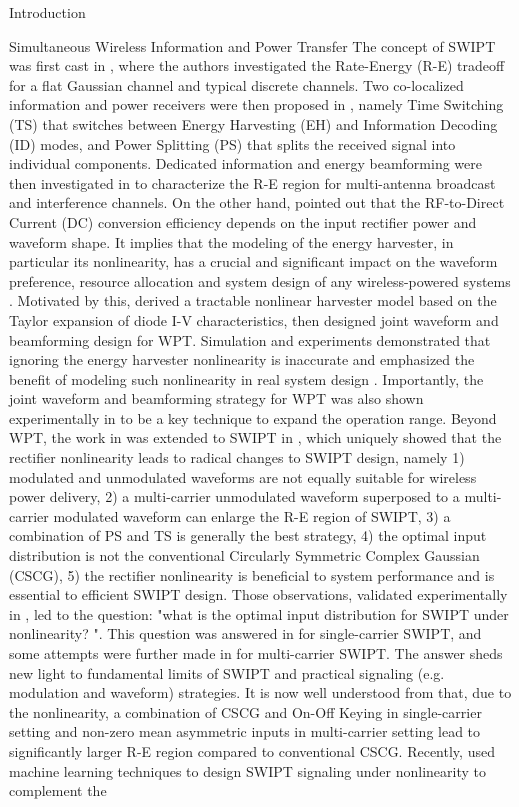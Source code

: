 \documentclass[journal]{IEEEtran}
\begin{document}
\begin{section}{Introduction}
\begin{subsection}{Simultaneous Wireless Information and Power Transfer}
			The concept of SWIPT was first cast in \cite{Varshney2008}, where the authors investigated the Rate-Energy (R-E) tradeoff for a flat Gaussian channel and typical discrete channels. Two co-localized information and power receivers were then proposed in \cite{Zhou2013}, namely Time Switching (TS) that switches between Energy Harvesting (EH) and Information Decoding (ID) modes, and Power Splitting (PS) that splits the received signal into individual components. Dedicated information and energy beamforming were then investigated in \cite{Zhang2013,Park2014} to characterize the R-E region for multi-antenna broadcast and interference channels. On the other hand, \cite{Trotter2009} pointed out that the RF-to-Direct Current (DC) conversion efficiency depends on the input rectifier power and waveform shape. It implies that the modeling of the energy harvester, in particular its nonlinearity, has a crucial and significant impact on the waveform preference, resource allocation and system design of any wireless-powered systems \cite{Trotter2009,Clerckx2018,Clerckx2019}. Motivated by this, \cite{Clerckx2016a} derived a tractable nonlinear harvester model based on the Taylor expansion of diode I-V characteristics, then designed joint waveform and beamforming design for WPT. Simulation and experiments demonstrated that ignoring the energy harvester nonlinearity is inaccurate and emphasized the benefit of modeling such nonlinearity in real system design \cite{Kim2019,Kim2020a}. Importantly, the joint waveform and beamforming strategy for WPT was also shown experimentally in \cite{Kim2020} to be a key technique to expand the operation range. Beyond WPT, the work in \cite{Clerckx2016a} was extended to SWIPT in \cite{Clerckx2018b}, which uniquely showed that the rectifier nonlinearity leads to radical changes to SWIPT design, namely 1) modulated and unmodulated waveforms are not equally suitable for wireless power delivery, 2) a multi-carrier unmodulated waveform superposed to a multi-carrier modulated waveform can enlarge the R-E region of SWIPT, 3) a combination of PS and TS is generally the best strategy, 4) the optimal input distribution is not the conventional Circularly Symmetric Complex Gaussian (CSCG), 5) the rectifier nonlinearity is beneficial to system performance and is essential to efficient SWIPT design. Those observations, validated experimentally in \cite{Kim2019}, led to the question: "what is the optimal input distribution for SWIPT under nonlinearity? ". This question was answered in \cite{Varasteh2020} for single-carrier SWIPT, and some attempts were further made in \cite{Varasteh2019d} for multi-carrier SWIPT. The answer sheds new light to fundamental limits of SWIPT and practical signaling (e.g. modulation and waveform) strategies. It is now well understood from \cite{Clerckx2018b,Varasteh2020,Varasteh2019d} that, due to the nonlinearity, a combination of CSCG and On-Off Keying in single-carrier setting and non-zero mean asymmetric inputs in multi-carrier setting lead to significantly larger R-E region compared to conventional CSCG. Recently, \cite{Varasteh2020a} used machine learning techniques to design SWIPT signaling under nonlinearity to complement the 
\end{subsection}
\end{section}
\end{document}
